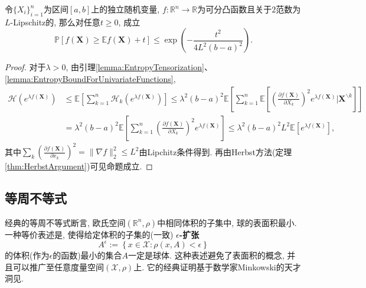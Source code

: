 \begin{proposition}
	令$\{X_i\}_{i=1}^n$为区间$[a, b]$上的独立随机变量, $f \colon \mathbb{R}^n \to \mathbb{R}$为可分凸函数且关于$2$范数为$L$-Lipschitz的, 那么对任意$t \geq 0$, 成立
	\begin{equation*}
		\mathbb{P}[f(\bm{X}) \geq \mathbb{E}f(\bm{X}) + t] 
		\leq \exp \left( - \frac{t^2}{4L^2 (b-a)^2} \right). 
	\end{equation*}	
\end{proposition}
\begin{proof}
	对于$\lambda > 0$, 由引理\ref{lemma:EntropyTensorization}、 \ref{lemma:EntropyBoundForUnivariateFunctions}, 
	\begin{align*}
		\mathcal{H}(e^{\lambda f(\bm{X})})
		&\leq \mathbb{E}\left[ \sum_{k=1}^n \mathcal{H}_k (e^{\lambda f(\bm{X})}) \right]
		\leq \lambda^2 (b-a)^2  \mathbb{E}\left[ \sum_{k=1}^n \mathbb{E}\left[ \left(\frac{\partial f(\bm{X})}{\partial X_k} \right)^2 e^{\lambda f(\bm{X})} \bigg| \bm{X}^{\backslash k} \right] \right] \\
		&= \lambda^2 (b-a)^2  \mathbb{E}\left[ \sum_{k=1}^n \left(\frac{\partial f(\bm{X})}{\partial X_k} \right)^2 e^{\lambda f(\bm{X})}\right]
		\leq \lambda^2 (b-a)^2 L^2 \mathbb{E}[e^{\lambda f(\bm{X})}], 
	\end{align*}
	其中$\sum_k \left( \frac{\partial f(\bm{X})}{\partial x_k} \right)^2 = \|\nabla f\|_2^2 \leq L^2$由Lipchitz条件得到. 
	再由Herbst方法(定理\ref{thm:HerbstArgument})可见命题成立. 
\end{proof}



\subsection{等周不等式}

经典的等周不等式断言, 欧氏空间$(\mathbb{R}^n, \rho)$中相同体积的子集中, 球的表面积最小. 
一种等价表述是, 使得给定体积的子集的(一致) \textbf{$\epsilon$-扩张}
\begin{equation*}
	A^{\epsilon} := \left\{ x \in \mathcal{X} \colon \rho(x, A) < \epsilon \right\}
\end{equation*}
的体积(作为$\epsilon$的函数)最小的集合$A$一定是球体.  
这种表述避免了表面积的概念, 并且可以推广至任意度量空间$(\mathcal{X}, \rho)$上. 
它的经典证明基于数学家Minkowski的天才洞见. 

